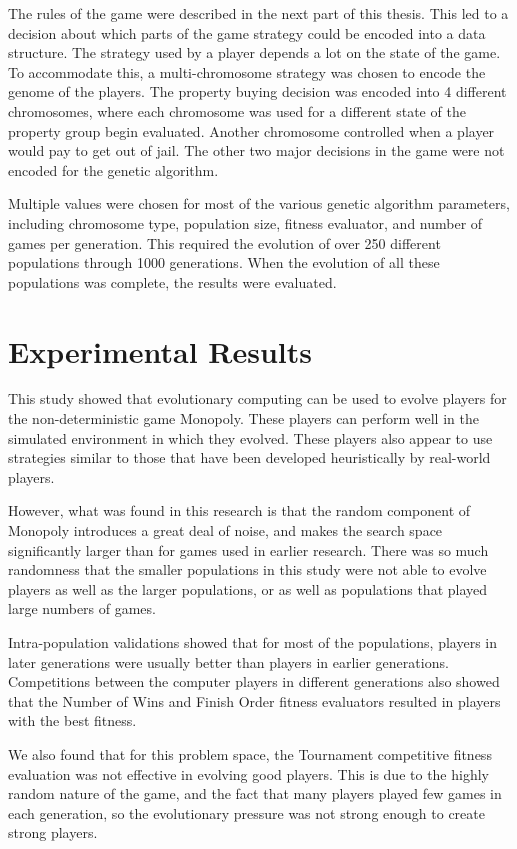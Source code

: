 The rules of the game were described in the next part of this thesis. This led
to a decision about which parts of the game strategy could be encoded into a
data structure. The strategy used by a player depends a lot on the state of the
game. To accommodate this, a multi-chromosome strategy was chosen to encode the
genome of the players. The property buying decision was encoded into 4 different
chromosomes, where each chromosome was used for a different state of the
property group begin evaluated. Another chromosome controlled when a player
would pay to get out of jail. The other two major decisions in the game were not
encoded for the genetic algorithm.

Multiple values were chosen for most of the various genetic algorithm
parameters, including chromosome type, population size, fitness evaluator, and
number of games per generation. This required the evolution of over 250
different populations through 1000 generations. When the evolution of all these
populations was complete, the results were evaluated.

\section{Experimental Results}

This study showed that evolutionary computing can be used to evolve players for
the non-deterministic game Monopoly. These players can perform well in the
simulated environment in which they evolved. These players also appear to use
strategies similar to those that have been developed heuristically by real-world
players.

However, what was found in this research is that the random component of
Monopoly introduces a great deal of noise, and makes the search space
significantly larger than for games used in earlier research. There was so much
randomness that the smaller populations in this study were not able to evolve
players as well as the larger populations, or as well as populations that played
large numbers of games.

Intra-population validations showed that for most of the populations, players in
later generations were usually better than players in earlier generations.
Competitions between the computer players in different generations also showed
that the Number of Wins and Finish Order fitness evaluators resulted in players
with the best fitness.

We also found that for this problem space, the Tournament competitive fitness
evaluation was not effective in evolving good players. This is due to the
highly random nature of the game, and the fact that many players played few
games in each generation, so the evolutionary pressure was not strong enough to
create strong players.

